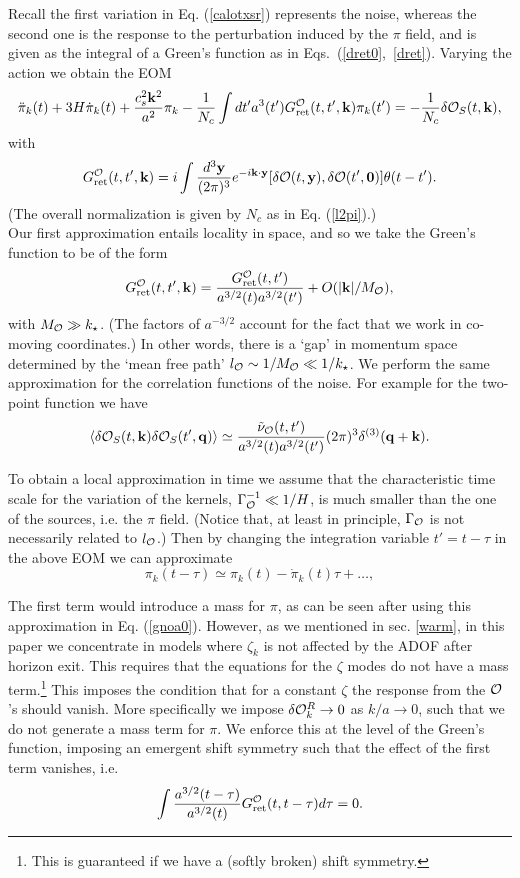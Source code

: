 \documentclass[11pt,amsmath,floats,floatfix,nofootinbib,secnumarabic, superscriptaddress, tightenlines]{revtex4}
\newcommand{\beq}{\begin{equation}}
\newcommand{\eeq}{\end{equation}}
\newcommand{\be}{\begin{equation}}
\newcommand{\ee}{\end{equation}}
\newcommand{\calo}{{\cal O}}
\begin{document}
{Recall the first variation in Eq. (\ref{calotxsr}) represents the noise, whereas the second one is the response to the perturbation induced by the $\pi$ field, and is given as the integral of a Green's function as in Eqs.~(\ref{dret0},~\ref{dret}).  Varying the action we obtain the EOM
\beq
\label{gnoa0}
\ddot\pi_k(t) + 3H \dot\pi_k(t)+ \frac{c_s^2{\bf k}^2}{a^2} \pi_k -
\frac{1}{N_c}\int dt'a^3(t') G_{\rm ret}^\calo(t,t',{\bf k}) \pi_{k}(t') =- \frac{1}{N_c} \delta\calo_S(t,{\bf k}),
\eeq
with
\beq
\label{gnoa1}
G_{\rm ret}^\calo(t,t',{\bf k})  = i \int \frac{d^3 {\bf y}}{(2\pi)^3} e^{-i{\bf k}\cdot {\bf y}} [\delta\calo(t,{\bf y}),\delta\calo(t',{\bf 0})]\theta(t-t').
\eeq
(The overall normalization is given by $N_c$ as in Eq. (\ref{l2pi}).)\\

Our first approximation entails locality in space, and so we take the Green's function to be of the form
\beq
\label{gnoa2}
G_{\rm ret}^\calo(t,t',{\bf k}) = \frac{G_{\rm ret}^\calo (t,t')}{a^{3/2}(t)a^{3/2}(t')} + O(|{\bf k}|/M_\calo),
\eeq
with $M_{\calo}\gg k_\star$. (The factors of $a^{-3/2}$ account for the fact that we work in co-moving coordinates.) In other words, there is a `gap' in momentum space determined by the `mean free path' $l_\calo \sim 1/M_\calo \ll 1/k_\star$. We perform the same approximation for the correlation functions of the noise. For example for the two-point function we have
\beq
\label{twop1}
\langle \delta\calo_S(t,{\bf k})\delta\calo_S(t',{\bf q})\rangle \simeq \frac{\tilde{\nu}_{\calo}(t,t')}{a^{3/2}(t)a^{3/2}(t')} (2\pi)^3\delta^{(3)}({\bf q+\bf k}).
\eeq

To obtain a local approximation in time we assume that the characteristic time scale for the variation of the kernels, $\Gamma_\calo^{-1} \ll 1/H$, is much
 smaller than the one of the sources, i.e. the $\pi$ field. (Notice that, at least in principle, $\Gamma_{\calo}$ is not necessarily related to $l_{\calo}$.) Then by changing the integration variable $t'=t-\tau$ in the above EOM we can approximate
\beq
\label{pikap}
 \pi_k(t-\tau)\simeq \pi_k(t)-\dot\pi_k(t) \tau + \ldots,
\eeq

The first term would introduce a mass for $\pi$, as can be seen after using this approximation in Eq. (\ref{gnoa0}). However, as we mentioned in sec. \ref{warm}, in this paper we concentrate in models where $\zeta_k$  is not affected by the ADOF after horizon exit.  This requires that the equations for the $\zeta$ modes do not have a mass term.\footnote{This is guaranteed if we have a (softly broken) shift symmetry.} This imposes the condition that for a constant $\zeta$ the response from the $\calo$'s should vanish. More specifically we impose $\delta\calo^R_k \to 0$ as $k/a \to 0$, such that we do not generate a mass term for $\pi$. We enforce this at the level of the Green's function, imposing an emergent shift symmetry such that the effect of the first term vanishes, i.e.
\be
\int \frac{a^{3/2}(t-\tau)}{a^{3/2}(t)}G_{\rm ret}^\calo(t,t-\tau)d\tau = 0 .
\ee

}
\end{document}
